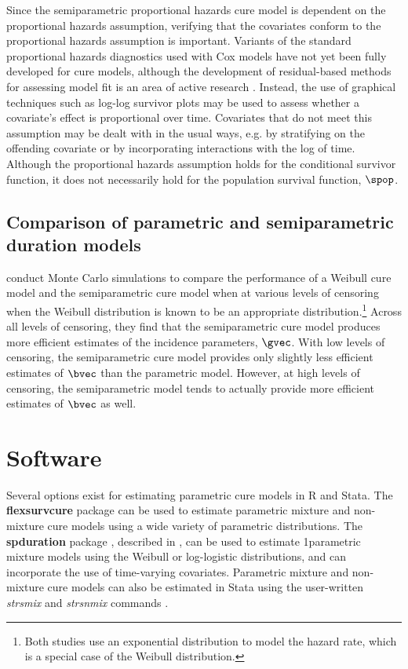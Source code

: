 Since the semiparametric proportional hazards cure model is dependent on the proportional hazards assumption, verifying that the covariates conform to the proportional hazards assumption is important. 
Variants of the standard proportional hazards diagnostics used with Cox models have not yet been fully developed for cure models, although the development of residual-based methods for assessing model fit is an area of active research \citep{peng2017, ramires2018}. Instead, the use of graphical techniques such as log-log survivor plots may be used to assess whether a covariate's effect is proportional over time. Covariates that do not meet this assumption may be dealt with in the usual ways, e.g. by stratifying on the offending covariate or by incorporating interactions with the log of time. Although the proportional hazards assumption holds for the conditional survivor function, it does not necessarily hold for the population survival function, $\spop$.
		
\subsection{Comparison of parametric and semiparametric duration models}
\citet{kuk1992, sy2000} conduct Monte Carlo simulations to compare the performance of a Weibull cure model and the semiparametric cure model when at various levels of censoring when the Weibull distribution is known to be an appropriate distribution.\footnote{Both studies use an exponential distribution to model the hazard rate, which is a special case of the Weibull distribution.} Across all levels of censoring, they find that the semiparametric cure model produces more efficient estimates of the incidence parameters, $\gvec$. With low levels of censoring, the semiparametric cure model provides only slightly less efficient estimates of $\bvec$ than the parametric model. However, at high levels of censoring, the semiparametric model tends to actually provide more efficient estimates of $\bvec$ as well.

\section{Software}
		Several options exist for estimating parametric cure models in R and Stata. The \textbf{flexsurvcure} package \citep{amdahl2017} can be used to estimate parametric mixture and non-mixture cure models using a wide variety of parametric distributions. The \textbf{spduration} package \citep{beger2017a}, described in \citep{beger2017a}, can be used to estimate 1parametric mixture models using the Weibull or log-logistic distributions, and can incorporate the use of time-varying covariates. Parametric mixture and non-mixture cure models can also be estimated in Stata using the user-written \textit{strsmix} and \textit{strsnmix} commands \citep{lambert2007}.
		
